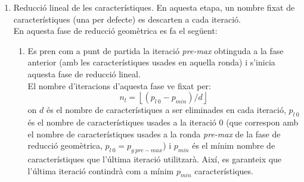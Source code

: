 \documentclass{article} %
\begin{document}
{\begin{enumerate}
{\begin{enumerate}
{\begin{enumerate}
{\begin{enumerate}
{									on $p_{g\ 0}$ és el nombre de característiques de les dades originals i que s'utilitzaran a la iteració 0 ($p_{g\ 0} = p$), $q$ és el ratio d'eliminació de característiques a cada iteració i $p_{min}$ és el mínim nombre de característiques que l'última iteració utilitzarà. Així, es garanteix que l'última iteració ($n_g - 1$) contindrà com a mínim $p_{min}$ característiques. \\
								}
								\item {
									S'executen les $n_g$ iteracions. Per a cada iteració, es repeteixen els passos 1 i 2 anteriors. Així, es calcula la funció $support$ i el valor mitjà de l'$accuracy$ de tots els kNN. Tal i com ja s'ha comentat, la funció $support$ s'utilitza per a determinar quines característiques s'han de seleccionar per a la següent iteració. També, es té en compte el ratio $q$ seleccionat per tal de saber el nombre de característiques de les següents iteracions:
									\[p_{g\ i+1} = p_{g\ i} \cdot (1 - q) \]
								}
								\item Llavors, al final de totes les iteracions, s'obté una mesura que dóna el valor mitjà de l'$accuracy$ dels kNN per a cada ronda.
								\item A partir d'aquesta mesura, es busca la iteració en la que s'ha obtingut el valor mitjà màxim de l'$accuracy$ dels kNN i se selecciona la iteració prèvia (anomenada \textit{pre-max}).
							\end{enumerate}
						}
						\item {
							Reducció lineal de les característiques. En aquesta etapa, un nombre fixat de característiques (una per defecte) es descarten a cada iteració. \\
							En aquesta fase de reducció geomètrica es fa el següent:
							\begin{enumerate}
								\item{
									Es pren com a punt de partida la iteració \textit{pre-max} obtinguda a la fase anterior (amb les característiques usades en aquella ronda) i s'inicia aquesta fase de reducció lineal. \\
									El nombre d'iteracions d'aquesta fase ve fixat per:
									\[n_l = \left \lfloor{(p_{l\ 0}-p_{min})/d}\right \rfloor \]
									on $d$ és el nombre de característiques a ser eliminades en cada iteració, $p_{l\ 0}$ és el nombre de característiques usades a la iteració 0 (que correspon amb el nombre de característiques usades a la ronda \textit{pre-max} de la fase de reducció geomètrica, $p_{l\ 0} = p_{g\ pre-max}$) i $p_{min}$ és el mínim nombre de característiques que l'última iteració utilitzarà. Així, es garanteix que l'última iteració contindrà com a mínim $p_{min}$ característiques. \\
}
\end{enumerate}}
\end{enumerate}}
\end{enumerate}}
\end{enumerate}}
\end{document}

